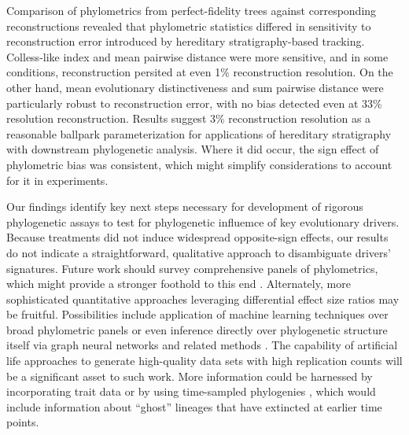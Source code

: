 Comparison of phylometrics from perfect-fidelity trees against corresponding reconstructions revealed that phylometric statistics differed in sensitivity to reconstruction error introduced by hereditary stratigraphy-based tracking.
Colless-like index and mean pairwise distance were more sensitive, and in some conditions, reconstruction persited at even 1\% reconstruction resolution.
On the other hand, mean evolutionary distinctiveness and sum pairwise distance were particularly robust to reconstruction error, with no bias detected even at 33\% resolution reconstruction.
Results suggest 3\% reconstruction resolution as a reasonable ballpark parameterization for applications of hereditary stratigraphy with downstream phylogenetic analysis.
Where it did occur, the sign effect of phylometric bias was consistent, which might simplify considerations to account for it in experiments.

Our findings identify key next steps necessary for development of rigorous phylogenetic assays to test for phylogenetic influemce of key evolutionary drivers.
Because treatments did not induce widespread opposite-sign effects, our results do not indicate a straightforward, qualitative approach to disambiguate drivers' signatures.
Future work should survey comprehensive panels of phylometrics, which might provide a stronger foothold to this end \citep{tuckerGuidePhylogeneticMetrics2017}.
Alternately, more sophisticated quantitative approaches leveraging differential effect size ratios may be fruitful.
Possibilities include application of machine learning techniques over broad phylometric panels \citep{voznica2022deep} or even inference directly over phylogenetic structure itself via graph neural networks and related methods \citep{lajaaiti2023comparison}.
The capability of artificial life approaches to generate high-quality data sets with high replication counts will be a significant asset to such work.
More information could be harnessed by incorporating trait data \citep{nozoe2017inferring} or by using time-sampled phylogenies \citep{volz2013viral}, which would include information about ``ghost'' lineages that have extincted at earlier time points.

